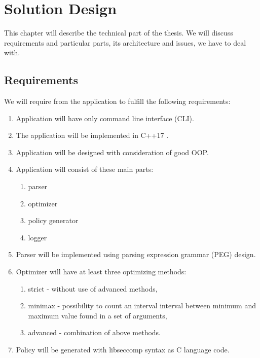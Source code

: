 \chapter{Solution Design}
\label{chap:design}
This chapter will describe the technical part of the thesis.
We will discuss requirements and particular parts, its architecture and issues, we have to deal with.

\section{Requirements}
\label{sec:requirements}
We will require from the application to fulfill the following requirements:
\begin{enumerate}
\item Application will have only command line interface (CLI).
\item The application will be implemented in C++17 \cite{ISO14882}.
\item Application will be designed with consideration of good OOP.
\item Application will consist of these main parts:
	\begin{enumerate}
    \item parser
    \item optimizer
    \item policy generator
    \item logger
	\end{enumerate}
\item Parser will be implemented using parsing expression grammar (PEG) \cite{PEG_def} design.
\item Optimizer will have at least three optimizing methods:
	\begin{enumerate}
    \item strict - without use of advanced methods,
    \item minimax - possibility to  count an interval interval between minimum and maximum value found in a set of arguments,
    \item advanced - combination of above methods.
	\end{enumerate}
\item Policy will be generated with libseccomp \cite{libseccomp_git} syntax as C language \cite{ISO9899} code.
\end{enumerate}

